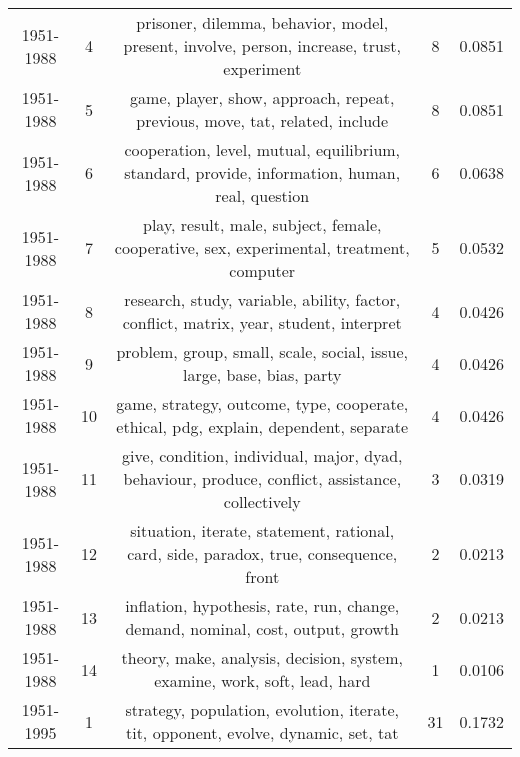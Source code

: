 \begin{tabular}{ccccc}
 1951-1988 &               4 &                     prisoner, dilemma, behavior, model, present, involve, person, increase, trust, experiment &                8 &                  0.0851 \\
 1951-1988 &               5 &                                   game, player, show, approach, repeat, previous, move, tat, related, include &                8 &                  0.0851 \\
 1951-1988 &               6 &                cooperation, level, mutual, equilibrium, standard, provide, information, human, real, question &                6 &                  0.0638 \\
 1951-1988 &               7 &                      play, result, male, subject, female, cooperative, sex, experimental, treatment, computer &                5 &                  0.0532 \\
 1951-1988 &               8 &                        research, study, variable, ability, factor, conflict, matrix, year, student, interpret &                4 &                  0.0426 \\
 1951-1988 &               9 &                                         problem, group, small, scale, social, issue, large, base, bias, party &                4 &                  0.0426 \\
 1951-1988 &              10 &                          game, strategy, outcome, type, cooperate, ethical, pdg, explain, dependent, separate &                4 &                  0.0426 \\
 1951-1988 &              11 &              give, condition, individual, major, dyad, behaviour, produce, conflict, assistance, collectively &                3 &                  0.0319 \\
 1951-1988 &              12 &                        situation, iterate, statement, rational, card, side, paradox, true, consequence, front &                2 &                  0.0213 \\
 1951-1988 &              13 &                               inflation, hypothesis, rate, run, change, demand, nominal, cost, output, growth &                2 &                  0.0213 \\
 1951-1988 &              14 &                                     theory, make, analysis, decision, system, examine, work, soft, lead, hard &                1 &                  0.0106 \\
 \midrule
 1951-1995 &               1 &                            strategy, population, evolution, iterate, tit, opponent, evolve, dynamic, set, tat &               31 &                  0.1732 \\

\end{tabular}
